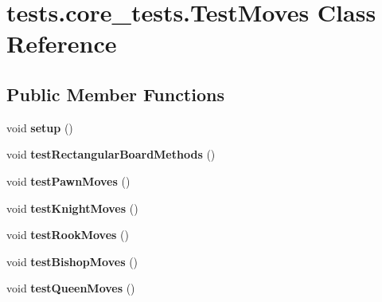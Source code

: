 \hypertarget{classtests_1_1core__tests_1_1_test_moves}{\section{tests.\-core\-\_\-tests.\-Test\-Moves Class Reference}
\label{classtests_1_1core__tests_1_1_test_moves}
}
\subsection*{Public Member Functions}
\begin{DoxyCompactItemize}
\item 
\hypertarget{classtests_1_1core__tests_1_1_test_moves_a45c2007c0c18c40280ab2aba52293d56}{void {\bfseries setup} ()}\label{classtests_1_1core__tests_1_1_test_moves_a45c2007c0c18c40280ab2aba52293d56}

\item 
\hypertarget{classtests_1_1core__tests_1_1_test_moves_abbcc229dd74d12b55bb5470c6cde83d5}{void {\bfseries test\-Rectangular\-Board\-Methods} ()}\label{classtests_1_1core__tests_1_1_test_moves_abbcc229dd74d12b55bb5470c6cde83d5}

\item 
\hypertarget{classtests_1_1core__tests_1_1_test_moves_a098c97c200f9732a6f09626c0989e18f}{void {\bfseries test\-Pawn\-Moves} ()}\label{classtests_1_1core__tests_1_1_test_moves_a098c97c200f9732a6f09626c0989e18f}

\item 
\hypertarget{classtests_1_1core__tests_1_1_test_moves_a04469a1b9ecb3e79c921ff3aec591762}{void {\bfseries test\-Knight\-Moves} ()}\label{classtests_1_1core__tests_1_1_test_moves_a04469a1b9ecb3e79c921ff3aec591762}

\item 
\hypertarget{classtests_1_1core__tests_1_1_test_moves_a528360fefa052fe07af851698946c2a4}{void {\bfseries test\-Rook\-Moves} ()}\label{classtests_1_1core__tests_1_1_test_moves_a528360fefa052fe07af851698946c2a4}

\item 
\hypertarget{classtests_1_1core__tests_1_1_test_moves_a6e73b340a03033e42d2259bb6936a1e6}{void {\bfseries test\-Bishop\-Moves} ()}\label{classtests_1_1core__tests_1_1_test_moves_a6e73b340a03033e42d2259bb6936a1e6}

\item 
\hypertarget{classtests_1_1core__tests_1_1_test_moves_a7c85d3ad6f95e18e89742959d6800c57}{void {\bfseries test\-Queen\-Moves} ()}\label{classtests_1_1core__tests_1_1_test_moves_a7c85d3ad6f95e18e89742959d6800c57}


\end{DoxyCompactItemize}

